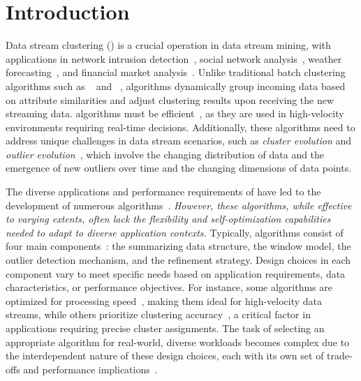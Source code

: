 \section{Introduction}
\label{sec:intro}
Data stream clustering (\dsc) is a crucial operation in data stream mining, with applications in network intrusion detection~\cite{KDD99}, social network analysis~\cite{EDMStream:17}, weather forecasting~\cite{weather_forecast:2020}, and financial market analysis~\cite{cai2012clustering}. Unlike traditional batch clustering algorithms such as \kmeans~\cite{KMeans:1967,KMeans:1982} and \dbscan~\cite{DBSCAN:1996}, \dsc algorithms dynamically group incoming data based on attribute similarities and adjust clustering results upon receiving the new streaming data. \dsc algorithms must be efficient~\cite{EmpiricalR:2017,Empirical:2018}, as they are used in high-velocity environments requiring real-time decisions. Additionally, these algorithms need to address unique challenges in data stream scenarios, such as \emph{cluster evolution} and \emph{outlier evolution}~\cite{EDMStream:17,concept_evolution:2010,Concept_Evolution:10,Concept_Evolution:16,Concept_Drift_Survey:2018}, which involve the changing distribution of data and the emergence of new outliers over time and the changing dimensions of data points.

The diverse applications and performance requirements of \dsc have led to the development of numerous \dsc algorithms~\cite{BIRCH:96,Clustream:03,EDMStream:17,DenStream:06,DBStream:16,DStream:2007,SL-KMeans:20,StreamKM++:12,TSFDBSCAN:20,DenStream:06,Stream_Clustering_Survey01,Survey13}. \emph{However, these algorithms, while effective to varying extents, often lack the flexibility and self-optimization capabilities needed to adapt to diverse application contexts.} Typically, \dsc algorithms consist of four main components~\cite{wang2023sesame}: the summarizing data structure, the window model, the outlier detection mechanism, and the refinement strategy. Design choices in each component vary to meet specific needs based on application requirements, data characteristics, or performance objectives. For instance, some algorithms are optimized for processing speed~\cite{DStream:2007}, making them ideal for high-velocity data streams, while others prioritize clustering accuracy~\cite{StreamKM++:12,BIRCH:96}, a critical factor in applications requiring precise cluster assignments. The task of selecting an appropriate \dsc algorithm for real-world, diverse workloads becomes complex due to the interdependent nature of these design choices, each with its own set of trade-offs and performance implications~\cite{wang2023sesame}.



